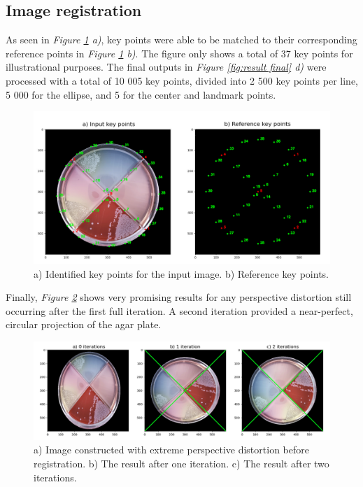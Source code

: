 \subsection{Image registration}
As seen in \textit{Figure \ref{fig:result keys} a)}, key points were able to be matched to their corresponding reference points in \textit{Figure \ref{fig:result keys} b)}. The figure only shows a total of 37 key points for illustrational purposes. The final outputs in \textit{Figure \ref{fig:result final} d)} were processed with a total of 10 005 key points, divided into 2 500 key points per line, 5 000 for the ellipse, and 5 for the center and landmark points.\\  

\begin{figure}[H]
      \centering
      \includegraphics[width=0.9\linewidth]{figures/PDF/Image_reg.pdf}
    \caption{a) Identified key points for the input image. b) Reference key points.}
    \label{fig:result keys}
\end{figure}

\noindent Finally, \textit{Figure \ref{fig:result projection}} shows very promising results for any perspective distortion still occurring after the first full iteration. A second iteration provided a near-perfect, circular projection of the agar plate. 

\begin{figure}[H]
      \centering
      \includegraphics[width=1\linewidth]{figures/PDF/Projection.pdf}
    \caption{a) Image constructed with extreme perspective distortion before registration.  b) The result after one iteration. c) The result after two iterations.}
    \label{fig:result projection}
\end{figure}


